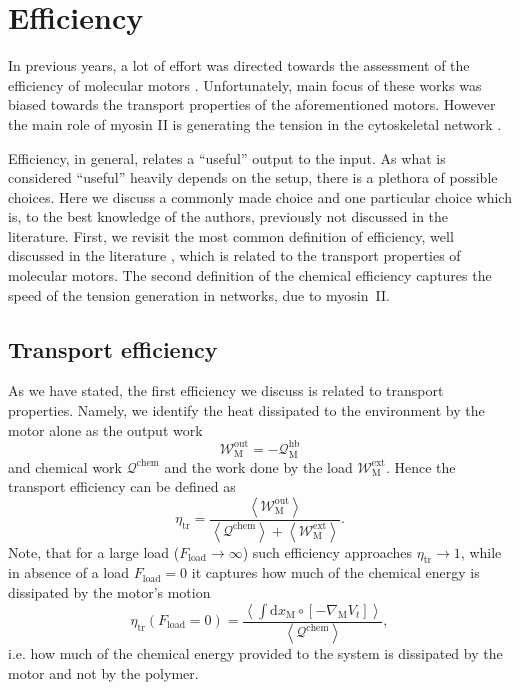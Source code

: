 \documentclass[aps,pre,twocolumn,showpacs,showkeys,superscriptaddress,floatfix]{revtex4-1}
\newcommand{\rmd}{{\mathrm d}}
\begin{document}
\section{Efficiency} 
\label{sec:efficiency}
In previous years, a lot of effort was directed towards the assessment of the efficiency of molecular motors \cite{Schmiedl2008,boksenbojm2009entropy}. %
Unfortunately, main focus of these works was biased towards the transport properties of the aforementioned motors. 
However the main role of myosin II is generating the tension in the cytoskeletal network \cite{ma2012nonmuscle,chugh2017actin,monier2010actomyosin}.

Efficiency, in general, relates a ``useful'' output to the input.
As what is considered ``useful'' heavily depends on the setup, there is a plethora of possible choices.
Here we discuss a commonly made choice and one particular choice which is, to the best knowledge of the authors, previously not discussed in the literature. 
First, we revisit the most common definition of efficiency, well discussed in the literature \cite{}, which is related to the transport properties of molecular motors. %
The second definition of the chemical efficiency captures the speed of the tension generation in networks, due to myosin~II. %

\subsection{Transport efficiency} 
As we have stated, the first efficiency we discuss is related to transport properties. 
Namely, we identify the heat dissipated to the environment by the motor alone as the output work 
\[
{\mathcal W}^\text{out}_\text{M} = - {\mathcal Q}^\text{hb}_\text{M} 
\] 
and chemical work $\mathcal Q^\text{chem}$ and the work done by the load $\mathcal W^\text{ext}_\text{M}$.
Hence the transport efficiency can be defined as 
\[
\eta_\text{tr} = \frac{ \left\langle {\mathcal W}^\text{out}_\text{M} \right\rangle }{ \left\langle {\mathcal Q}^\text{chem} \right\rangle + \left\langle {\mathcal W}^\text{ext}_\text{M} \right\rangle } .
\]
Note, that for a large load ($F_\text{load} \to \infty$) such efficiency approaches $\eta_\text{tr} \to 1$, 
while in absence of a load $F_\text{load} = 0$ it captures how much of the chemical energy is dissipated by the motor's motion  
\[
\eta_\text{tr}( F_\text{load} = 0 ) = \frac{ \left\langle \int \rmd x_\text{M} \circ \left[ - \nabla_\text{M} V_t \right] \right\rangle }{ \left\langle {\mathcal Q}^\text{chem} \right\rangle } ,
\]
i.e. how much of the chemical energy provided to the system is dissipated by the motor and not by the polymer. 
\end{document}
